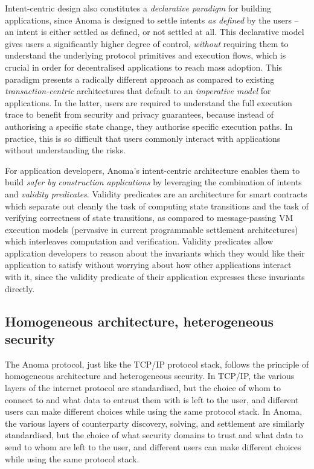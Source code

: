 \documentclass[
    9pt,            %
    commun,        %
    affiltop,       %
]{art}
\begin{document}
Intent-centric design also constitutes a \emph{declarative paradigm} for
building applications, since Anoma is designed to settle intents
\emph{as defined} by the users -- an intent is either settled as
defined, or not settled at all. This declarative model gives users a
significantly higher degree of control, \emph{without} requiring them to
understand the underlying protocol primitives and execution flows, which
is crucial in order for decentralised applications to reach mass
adoption. This paradigm presents a radically different approach as
compared to existing \emph{transaction-centric} architectures that
default to an \emph{imperative model} for applications. In the latter,
users are required to understand the full execution trace to benefit
from security and privacy guarantees, because instead of authorising a
specific state change, they authorise specific execution paths. In
practice, this is so difficult that users commonly interact with
applications without understanding the risks.

For application developers, Anoma's intent-centric
architecture enables them to build \emph{safer by construction
applications} by leveraging the combination of intents and \emph{validity
predicates}. Validity predicates are an architecture for smart contracts
which separate out cleanly the task of computing state transitions and the
task of verifying correctness of state transitions, as compared to
message-passing VM execution models (pervasive in current programmable
settlement architectures) which interleaves computation and verification.
Validity predicates allow application developers to reason about the
invariants which they would like their application to satisfy without
worrying about how other applications interact with it, since the validity
predicate of their application expresses these invariants directly.

\subsection{Homogeneous architecture, heterogeneous
security}\label{homogeneous-architecture-heterogeneous-security}

The Anoma protocol, just like the TCP/IP protocol stack, follows the
principle of homogeneous architecture and heterogeneous security. In
TCP/IP, the various layers of the internet protocol are standardised, but
the choice of whom to connect to and what data to entrust them with is left
to the user, and different users can make different choices while using the
same protocol stack. In Anoma, the various layers of counterparty
discovery, solving, and settlement are similarly standardised, but the
choice of what security domains to trust and what data to send to whom are
left to the user, and different users can make different choices while
using the same protocol stack.
\end{document}
